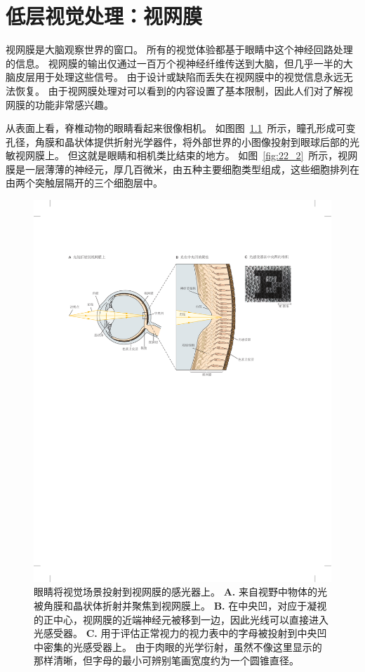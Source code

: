 \chapter{低层视觉处理：视网膜} \label{chap:chap22}

视网膜是大脑观察世界的窗口。
所有的视觉体验都基于眼睛中这个神经回路处理的信息。 
视网膜的输出仅通过一百万个视神经纤维传送到大脑，但几乎一半的大脑皮层用于处理这些信号。
由于设计或缺陷而丢失在视网膜中的视觉信息永远无法恢复。
由于视网膜处理对可以看到的内容设置了基本限制，因此人们对了解视网膜的功能非常感兴趣。


从表面上看，脊椎动物的眼睛看起来很像相机。
如图图~\ref{fig:22_1}~所示，瞳孔形成可变孔径，角膜和晶状体提供折射光学器件，将外部世界的小图像投射到眼球后部的光敏视网膜上。
但这就是眼睛和相机类比结束的地方。
如图~\ref{fig:22_2}~所示，视网膜是一层薄薄的神经元，厚几百微米，由五种主要细胞类型组成，这些细胞排列在由两个突触层隔开的三个细胞层中。


\begin{figure}[htbp]
	\centering
	\includegraphics[width=1.0\linewidth]{chap22/fig_22_1}
	\caption{眼睛将视觉场景投射到视网膜的感光器上。
		\textbf{A.} 来自视野中物体的光被角膜和晶状体折射并聚焦到视网膜上。
		\textbf{B.} 在中央凹，对应于凝视的正中心，视网膜的近端神经元被移到一边，因此光线可以直接进入光感受器。
		\textbf{C.} 用于评估正常视力的视力表中的字母被投射到中央凹中密集的光感受器上。
		由于肉眼的光学衍射，虽然不像这里显示的那样清晰，但字母的最小可辨别笔画宽度约为一个圆锥直径\cite{curcio1991organization}。}
	\label{fig:22_1}
\end{figure}


